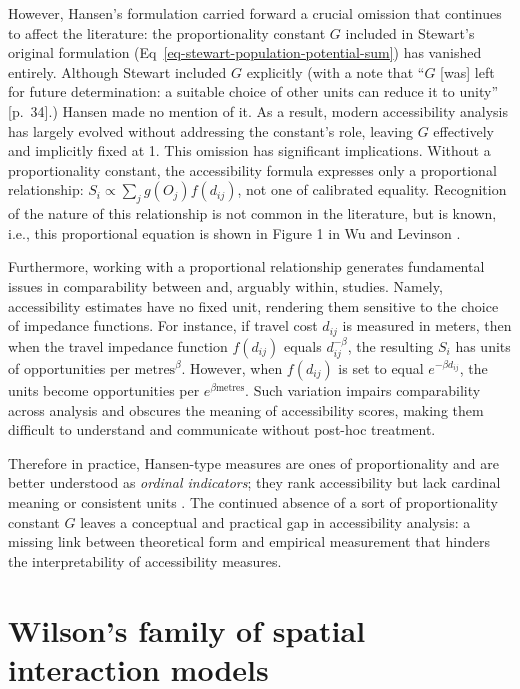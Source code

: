 \documentclass[
  10pt,
  letterpaper,
]{article}
\begin{document}
However, Hansen's formulation carried forward a crucial omission that
continues to affect the literature: the proportionality constant \(G\)
included in Stewart's original formulation
(Eq~\ref{eq-stewart-population-potential-sum}) has vanished entirely.
Although Stewart included \(G\) explicitly (with a note that ``\(G\)
{[}was{]} left for future determination: a suitable choice of other
units can reduce it to unity'' {[}p.~34{]}.) Hansen made no mention of
it. As a result, modern accessibility analysis has largely evolved
without addressing the constant's role, leaving \(G\) effectively and
implicitly fixed at 1. This omission has significant implications.
Without a proportionality constant, the accessibility formula expresses
only a proportional relationship:
\(S_i \propto \sum_j g(O_j)f(d_{ij})\), not one of calibrated equality.
Recognition of the nature of this relationship is not common in the
literature, but is known, i.e., this proportional equation is shown in
Figure 1 in Wu and Levinson \citep{wuUnifyingAccess2020}.

Furthermore, working with a proportional relationship generates
fundamental issues in comparability between and, arguably within,
studies. Namely, accessibility estimates have no fixed unit, rendering
them sensitive to the choice of impedance functions. For instance, if
travel cost \(d_{ij}\) is measured in meters, then when the travel
impedance function \(f(d_{ij})\) equals \(d_{ij}^{-\beta}\), the
resulting \(S_i\) has units of opportunities per
\(\text{metres}^{\beta}\). However, when \(f(d_{ij})\) is set to equal
\(e^{-\beta d_{ij}}\), the units become opportunities per
\(e^{\beta \text{metres}}\). Such variation impairs comparability across
analysis and obscures the meaning of accessibility scores, making them
difficult to understand and communicate without post-hoc treatment.

Therefore in practice, Hansen-type measures are ones of proportionality
and are better understood as \emph{ordinal indicators}; they rank
accessibility but lack cardinal meaning or consistent units
\citep{millerAccessibilityMeasurementApplication2018}. The continued
absence of a sort of proportionality constant \(G\) leaves a conceptual
and practical gap in accessibility analysis: a missing link between
theoretical form and empirical measurement that hinders the
interpretability of accessibility measures.

\section{Wilson's family of spatial interaction
models}\label{wilsons-family-of-spatial-interaction-models}
\end{document}
